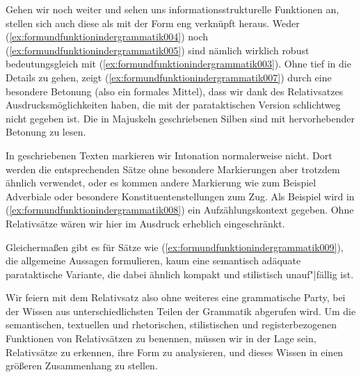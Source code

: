Gehen wir noch weiter und sehen uns informationsstrukturelle Funktionen an, stellen sich auch diese als mit der Form eng verknüpft heraus.
Weder (\ref{ex:formundfunktionindergrammatik004}) noch (\ref{ex:formundfunktionindergrammatik005}) sind nämlich wirklich robust bedeutungsgleich mit (\ref{ex:formundfunktionindergrammatik003}).
Ohne tief in die Details zu gehen, zeigt (\ref{ex:formundfunktionindergrammatik007}) durch eine besondere Betonung (also ein formales Mittel), dass wir dank des Relativsatzes Ausdrucksmöglichkeiten haben, die mit der parataktischen Version schlichtweg nicht gegeben ist.
Die in Majuskeln geschriebenen Silben sind mit hervorhebender Betonung zu lesen.

\begin{exe}
\end{exe}

In geschriebenen Texten markieren wir Intonation normalerweise nicht.
Dort werden die entsprechenden Sätze ohne besondere Markierungen aber trotzdem ähnlich verwendet, oder es kommen andere Markierung wie zum Beispiel Adverbiale oder besondere Konstituentenstellungen zum Zug.
Als Beispiel wird in (\ref{ex:formundfunktionindergrammatik008}) ein Aufzählungskontext gegeben.
Ohne Relativsätze wären wir hier im Ausdruck erheblich eingeschränkt.

\begin{exe}
\end{exe}

Gleichermaßen gibt es für Sätze wie (\ref{ex:formundfunktionindergrammatik009}), die allgemeine Aussagen formulieren, kaum eine semantisch adäquate parataktische Variante, die dabei ähnlich kompakt und stilistisch unauf"|fällig ist.

\begin{exe}
\end{exe}

Wir feiern mit dem Relativsatz also ohne weiteres eine grammatische Party, bei der Wissen aus unterschiedlichsten Teilen der Grammatik abgerufen wird.
Um die semantischen, textuellen und rhetorischen, stilistischen und registerbezogenen Funktionen von Relativsätzen zu benennen, müssen wir in der Lage sein, Relativsätze zu erkennen, ihre Form zu analysieren, und dieses Wissen in einen größeren Zusammenhang zu stellen.

